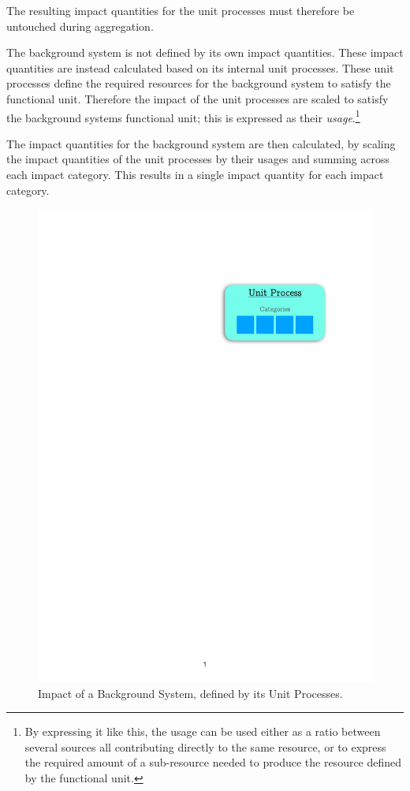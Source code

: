The resulting impact quantities for the unit processes must therefore be untouched during aggregation. 

The background system is not defined by its own impact quantities. These impact quantities are instead calculated based on its internal unit processes. These unit processes define the required resources for the background system to satisfy the functional unit. Therefore the impact of the unit processes are scaled to satisfy the background systems functional unit; this is expressed as their \emph{usage}.\footnote{By expressing it like this, the usage can be used either as a ratio between several sources all contributing directly to the same resource, or to express the required amount of a sub-resource needed to produce the resource defined by the functional unit.}

The impact quantities for the background system are then calculated, by scaling the impact quantities of the unit processes by their usages and summing across each impact category. This results in a single impact quantity for each impact category.

\begin{figure}[H]
    \centering
    \includegraphics[page=2, width=1\linewidth]{.Figures/ImpactAggregation.pdf}
    \caption{Impact of a Background System, defined by its Unit Processes.}
    \label{fig:BackgroundSystem-Aggregation}
\end{figure}

